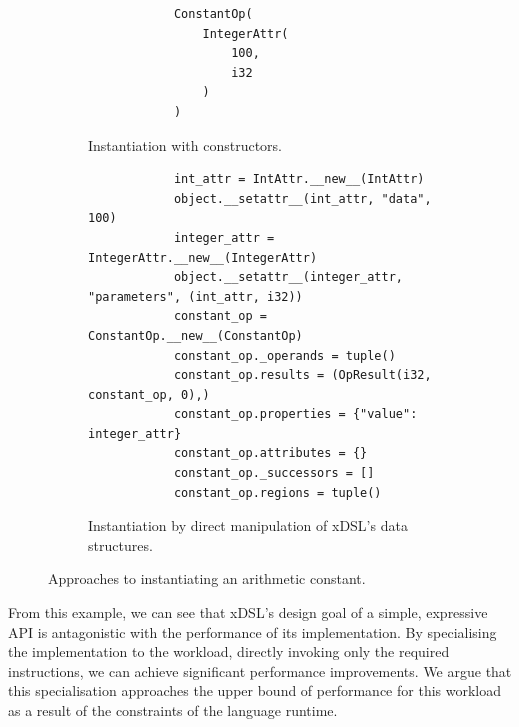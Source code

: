 

\begin{figure}[H]
    \begin{subfigure}[b]{0.4\textwidth}
       \centering
        \begin{verbatim}
            ConstantOp(
                IntegerAttr(
                    100,
                    i32
                )
            )
        \end{verbatim}
        \footnotesize\vspace{3em}
        \caption{Instantiation with constructors.}
        \label{listing:ubenchmark-xdsl-constant-constructor}
    \end{subfigure}
    \hfill
    \begin{subfigure}[b]{0.6\textwidth}
        \centering
        \begin{verbatim}
            int_attr = IntAttr.__new__(IntAttr)
            object.__setattr__(int_attr, "data", 100)
            integer_attr = IntegerAttr.__new__(IntegerAttr)
            object.__setattr__(integer_attr, "parameters", (int_attr, i32))
            constant_op = ConstantOp.__new__(ConstantOp)
            constant_op._operands = tuple()
            constant_op.results = (OpResult(i32, constant_op, 0),)
            constant_op.properties = {"value": integer_attr}
            constant_op.attributes = {}
            constant_op._successors = []
            constant_op.regions = tuple()
        \end{verbatim}
        \caption{Instantiation by direct manipulation of xDSL's data structures.}
        \label{listing:ubenchmark-xdsl-constant-direct}
    \end{subfigure}
    \captionsetup{name=Listing}
    \caption{Approaches to instantiating an arithmetic constant.}
    \label{listing:ubenchmark-xdsl-constant}
\end{figure}

From this example, we can see that xDSL's design goal of a simple, expressive API is antagonistic with the performance of its implementation. By specialising the implementation to the workload, directly invoking only the required instructions, we can achieve significant performance improvements. We argue that this specialisation approaches the upper bound of performance for this workload as a result of the constraints of the language runtime.

